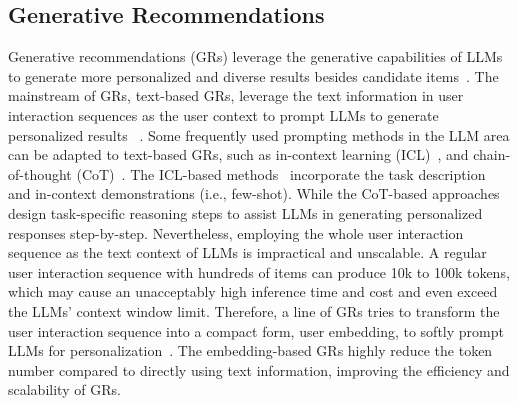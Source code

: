 \subsection{Generative Recommendations}
Generative recommendations (GRs) leverage the generative capabilities of LLMs to generate more personalized and diverse results besides candidate items~\cite{xu2024prompting,zhao2023recommender,zhang2023recommendation,wu2024survey}. The mainstream of GRs, text-based GRs, leverage the text information in user interaction sequences as the user context to prompt LLMs to generate personalized results ~\cite{liu2023chatgpt,petrov2023generative,kang2023llms,geng2022recommendation,lyu2023llm}. 
Some frequently used prompting methods in the LLM area can be adapted to text-based GRs, such as in-context learning (ICL)~\cite{gao2020making}, and chain-of-thought (CoT)~\cite{wei2022chain}. The ICL-based methods~\cite{liu2023chatgpt,li2023bookgpt} incorporate the task description and in-context demonstrations (i.e., few-shot). While the CoT-based approaches~\cite{huang2023recommender,wang2023recmind} design task-specific reasoning steps to assist LLMs in generating personalized responses step-by-step. 
Nevertheless, employing the whole user interaction sequence as the text context of LLMs is impractical and unscalable. A regular user interaction sequence with hundreds of items can produce 10k to 100k tokens, which may cause an unacceptably high inference time and cost and even exceed the LLMs' context window limit. Therefore, a line of GRs tries to transform the user interaction sequence into a compact form, user embedding, to softly prompt LLMs for personalization~\cite{li2023prompt,ning2024user,li2023personalized,hebert2024persoma}. The embedding-based GRs highly reduce the token number compared to directly using text information, improving the efficiency and scalability of GRs. 


